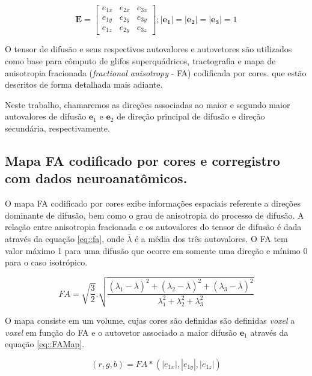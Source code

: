 \documentclass[
    12pt,                %
    oneside,            %
    a4paper,            %
    english,            %
    french,                %
    spanish,            %
    brazil                %
    ]{abntex2}
\begin{document}
\begin{equation}
\label{eq::decomposicao3}
\mathbf{E} = 
\begin{bmatrix} 
e_{1x} & e_{2x} & e_{3x} \\ 
e_{1y} & e_{2y} & e_{3y} \\ 
e_{1z} & e_{2y} & e_{3z}  
\end{bmatrix};
\mathbf{|e_1|} = \mathbf{|e_2|} = \mathbf{|e_3|} = 1
\end{equation}

O tensor de difusão e seus respectivos autovalores e autovetores são utilizados como base para cômputo de glifos superquádricos, tractografia e mapa de anisotropia fracionada (\textit{fractional anisotropy} - FA) codificada por cores. que estão descritos de forma detalhada mais adiante.

Neste trabalho, chamaremos as direções associadas ao maior e segundo maior autovalores de difusão $\mathbf{e}_1$ e $\mathbf{e}_2$ de direção principal de difusão e direção secundária, respectivamente.

\subsection{Mapa FA codificado por cores e corregistro com dados neuroanatômicos.}



O mapa FA codificado por cores exibe informações espaciais referente a direções dominante de difusão, bem como o grau de anisotropia do processo de difusão.
A relação entre anisotropia fracionada e os autovalores do tensor de difusão é dada através da equação \ref{eq::fa}, onde $\overline{\lambda}$ é a média dos três autovalores. O FA tem valor máximo 1 para uma difusão que ocorre em somente uma direção e mínimo 0 para o caso isotrópico.

\begin{equation}
\label{eq::fa}
    FA = \sqrt{\frac{3}{2}}.\sqrt{\frac{(\lambda_1 - \overline{\lambda})^2 + (\lambda_2 - \overline{\lambda})^2 + (\lambda_3 - \overline{\lambda})^2}{\lambda_1^2 + \lambda_2^2 + \lambda_3^2}}
\end{equation}




O mapa consiste em um volume, cujas cores são definidas são definidas \textit{voxel} a \textit{voxel} em função do FA e o autovetor associado a maior difusão $\mathbf{e}_1$ através da equação \ref{eq::FAMap}.

\begin{equation}
\label{eq::FAMap}
    (r,g,b) = FA*(|e_{1x}|,|e_{1y}|,|e_{1z}|)
\end{equation}
\end{document}
